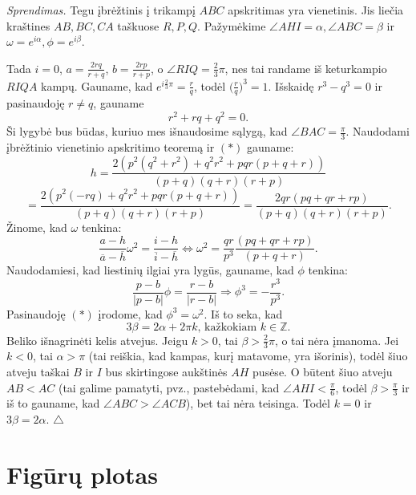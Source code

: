 \documentclass[11pt,a4paper,twoside]{book}
\newenvironment{sprendimas}{\noindent \textit{Sprendimas.}}{\hfill $\triangle$}
\theoremstyle{definition} \newtheorem*{api}{Apibrėžimas}
\theoremstyle{remark} \newtheorem*{pastaba}{Pastaba}
\begin{document}
\begin{sprendimas}
Tegu įbrėžtinis į trikampį $ABC$ apskritimas yra vienetinis. Jis liečia kraštines $AB, BC, CA$ taškuose $R, P, Q$. Pažymėkime $\angle AHI = \alpha, \angle ABC = \beta$ ir $\omega = e^{i\alpha}, \phi = e^{i\beta}$.

Tada $i=0$, $a=\frac{2rq}{r+q}$, $b=\frac{2rp}{r+p}$, o $\angle RIQ=\frac{2}{3}\pi$, nes tai randame iš keturkampio $RIQA$ kampų. Gauname, kad $e^{i\frac{2}{3}\pi}=\frac{r}{q}$, todėl $\Big(\frac{r}{q}\Big)^3=1$. Išskaidę $r^3-q^3=0$ ir pasinaudoję $r\ne q$, gauname
\begin{equation}
r^2 + rq + q^2 = 0. \tag{$*$}
\end{equation}
Ši lygybė bus būdas, kuriuo mes išnaudosime sąlygą, kad $\angle BAC = \frac{\pi}{3}$.
Naudodami įbrėžtinio vienetinio apskritimo teoremą ir $(*)$ gauname:
$$h=\frac{2(p^2(q^2 + r^2) + q^2r^2  + pqr(p + q+ r))}{(p+q)(q+r)(r+p)}$$
$$=\frac{2(p^2(-rq) + q^2r^2  + pqr(p + q+ r))}{(p+q)(q+r)(r+p)}=\frac{2qr(pq +qr+rp)}{(p+q)(q+r)(r+p)}.$$
Žinome, kad $\omega$ tenkina:
$$\frac{a-h}{\overline{a}-\overline{h}}\omega^2=\frac{i-h}{\overline{i}-\overline{h}} \Leftrightarrow \omega^2=\frac{qr}{p^3}\frac{(pq +qr+rp)}{(p+q+r)}.$$
Naudodamiesi, kad liestinių ilgiai yra lygūs, gauname, kad $\phi$ tenkina:
$$\frac{p-b}{|p-b|}\phi=\frac{r-b}{|r-b|} \Rightarrow \phi^3=-\frac{r^3}{p^3}.$$
Pasinaudoję $(*)$ įrodome, kad $\phi^3=\omega^2.$ Iš to seka, kad
$$3\beta=2\alpha + 2\pi k \text{, kažkokiam } k\in\mathbb{Z}.$$
Beliko išnagrinėti kelis atvejus. Jeigu $k>0$, tai $\beta>\frac{2}{3}\pi$, o tai nėra įmanoma. Jei $k<0$, tai $\alpha > \pi$ (tai reiškia, kad kampas, kurį matavome, yra išorinis), todėl šiuo atveju taškai $B$ ir $I$ bus skirtingose aukštinės $AH$ pusėse. O būtent šiuo atveju $AB<AC$ (tai galime pamatyti, pvz., pastebėdami, kad $\angle AHI < \frac{\pi}{6}$, todėl $\beta > \frac{\pi}{3}$ ir iš to gauname, kad $\angle ABC > \angle ACB$), bet tai nėra teisinga. Todėl $k=0$ ir $3\beta=2\alpha$.
\end{sprendimas}


















\chapter{Figūrų plotas}
\end{document}
